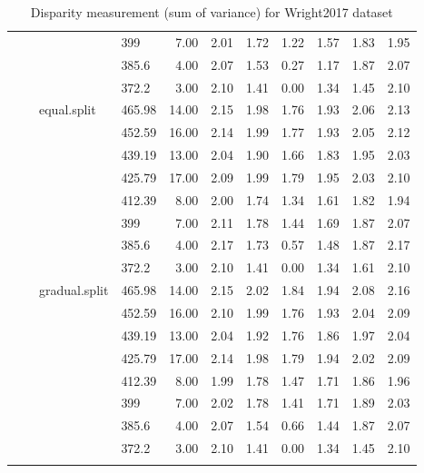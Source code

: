 \begin{longtable}{llllrrrrrrr}
   &  &  & 399 & 7.00 & 2.01 & 1.72 & 1.22 & 1.57 & 1.83 & 1.95 \\ 
   &  &  & 385.6 & 4.00 & 2.07 & 1.53 & 0.27 & 1.17 & 1.87 & 2.07 \\ 
   &  &  & 372.2 & 3.00 & 2.10 & 1.41 & 0.00 & 1.34 & 1.45 & 2.10 \\ 
   &  & equal.split & 465.98 & 14.00 & 2.15 & 1.98 & 1.76 & 1.93 & 2.06 & 2.13 \\ 
   &  &  & 452.59 & 16.00 & 2.14 & 1.99 & 1.77 & 1.93 & 2.05 & 2.12 \\ 
   &  &  & 439.19 & 13.00 & 2.04 & 1.90 & 1.66 & 1.83 & 1.95 & 2.03 \\ 
   &  &  & 425.79 & 17.00 & 2.09 & 1.99 & 1.79 & 1.95 & 2.03 & 2.10 \\ 
   &  &  & 412.39 & 8.00 & 2.00 & 1.74 & 1.34 & 1.61 & 1.82 & 1.94 \\ 
   &  &  & 399 & 7.00 & 2.11 & 1.78 & 1.44 & 1.69 & 1.87 & 2.07 \\ 
   &  &  & 385.6 & 4.00 & 2.17 & 1.73 & 0.57 & 1.48 & 1.87 & 2.17 \\ 
   &  &  & 372.2 & 3.00 & 2.10 & 1.41 & 0.00 & 1.34 & 1.61 & 2.10 \\ 
   &  & gradual.split & 465.98 & 14.00 & 2.15 & 2.02 & 1.84 & 1.94 & 2.08 & 2.16 \\ 
   &  &  & 452.59 & 16.00 & 2.10 & 1.99 & 1.76 & 1.93 & 2.04 & 2.09 \\ 
   &  &  & 439.19 & 13.00 & 2.04 & 1.92 & 1.76 & 1.86 & 1.97 & 2.04 \\ 
   &  &  & 425.79 & 17.00 & 2.14 & 1.98 & 1.79 & 1.94 & 2.02 & 2.09 \\ 
   &  &  & 412.39 & 8.00 & 1.99 & 1.78 & 1.47 & 1.71 & 1.86 & 1.96 \\ 
   &  &  & 399 & 7.00 & 2.02 & 1.78 & 1.41 & 1.71 & 1.89 & 2.03 \\ 
   &  &  & 385.6 & 4.00 & 2.07 & 1.54 & 0.66 & 1.44 & 1.87 & 2.07 \\ 
   &  &  & 372.2 & 3.00 & 2.10 & 1.41 & 0.00 & 1.34 & 1.45 & 2.10 \\ 
   \hline
\hline
\caption{Disparity measurement (sum of variance) for Wright2017 dataset} 
\end{longtable}

